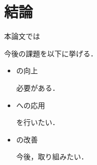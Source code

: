 \chapter{結論}
本論文では

今後の課題を以下に挙げる．
\begin{itemize}
	\item の向上
	\par
	必要がある．
	\item への応用
	\par
	を行いたい．
	\newpage
	\item の改善
	\par
	今後，取り組みたい．
\end{itemize}
